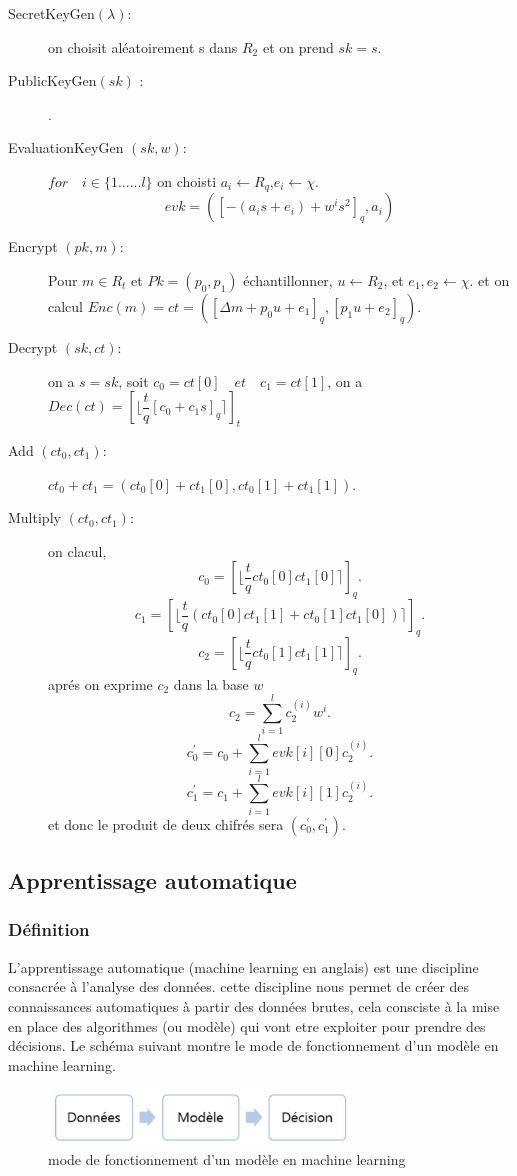 \documentclass[a4paper,12pt]{article}
\begin{document}
 \begin{description}
 \item[SecretKeyGen$(\lambda)$:]  on choisit aléatoirement s dans $R_2$ et on prend $sk=s$.
 \item[PublicKeyGen$(sk)$ :] .
 \item[EvaluationKeyGen $(sk, w)$:] $for\quad i\in \{1......l\}$ on choisti $a_i\xleftarrow{}{}R_q$,$e_i\xleftarrow{}{}\chi.$\newline
 $$evk = ([-(a_is+e_i)+w^is^2]_q, a_i)$$
 \item[Encrypt $(pk, m)$:] Pour $m \in R_t$ et $Pk = (p_0, p_1)$ échantillonner, $u\xleftarrow{}{} {R_2}$, et $e_1,e_2 \xleftarrow{}{} \chi$.
 \newline et on calcul $Enc(m) = ct = ([\Delta m + p_0 u + e_1]_q, [p_1 u + e_2]_q).$
 \item[Decrypt $(sk, ct)$:] on a $s = sk $, soit $c_0 = ct[0]\quad et\quad c_1 = ct[1]$, on a $Dec(ct) = [\lfloor\dfrac{t}{q}[c_0 + c_1 s]_q\rceil]_t$
 \item[Add  $(ct_0, ct_1)$:]  $ct_0 + ct_1 = (ct_0[0] + ct_1[0], ct_0[1] + ct_1[1])$.
 \item[Multiply $(ct_0, ct_1)$:] on clacul, \newline
 $$c_0 = [\lfloor\dfrac{t}{q}ct_0[0]ct_1[0]\rceil]_q.$$
 $$c_1 = [\lfloor\dfrac{t}{q}(ct_0[0]ct_1[1] + ct_0[1]ct_1[0])\rceil]_q.$$
 $$c_2 = [\lfloor\dfrac{t}{q}ct_0[1]ct_1[1]\rceil]_q .$$ 
 aprés on exprime $c_2 $ dans la base $w$ $$c_2 = \sum_{i=1}^{l}c_2^{(i)}w^i.$$
 $$c_0^{'} = c_0 + \sum_{i=1}^{l}evk[i][0]c_2^{(i)} .$$
 $$c_1^{'} = c_1 + \sum_{i=1}^{l}evk[i][1]c_2^{(i)} .$$
 et donc le produit de deux chifrés sera $(c_0^{'}, c_1^{'}).$
  \end{description}
\subsection{Apprentissage automatique}
\subsubsection{Définition}
L'apprentissage automatique (machine learning en anglais) est une discipline consacrée à l'analyse des données. cette discipline nous permet de créer des connaissances automatiques à partir des données brutes, cela consciste à la mise en place des algorithmes (ou modèle) qui vont etre exploiter pour prendre des décisions.\newline
Le schéma suivant montre le mode de fonctionnement d'un modèle en machine learning.\newline
\begin{figure}[h!]\begin{center}
    \includegraphics[width=8cm]{m_learning.png}
    \caption{mode de fonctionnement d'un modèle en machine learning}
    \label{fig:m_learning}
  \end{center}
  \end{figure}
\end{document}
